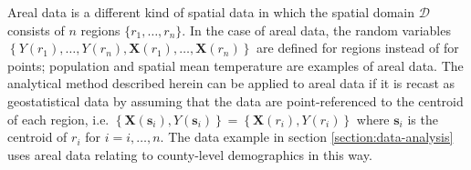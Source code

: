 \documentclass[authoryear, review, 11pt]{elsarticle}
\begin{document}
	Areal data is a different kind of spatial data in which the spatial domain $\mathcal{D}$ consists of $n$ regions $\{r_1, \dots, r_n\}$. In the case of areal data, the random variables $\left\{Y(r_1), \dots, Y(r_n), \bm{X}(r_1), \dots, \bm{X}(r_n)\right\}$ are defined for regions instead of for points; population and spatial mean temperature are examples of areal data. The analytical method described herein can be applied to areal data if it is recast as geostatistical data by assuming that the data are point-referenced to the centroid of each region, i.e. $\left\{\bm{X}(\bm{s}_i), Y(\bm{s}_i)\right\} = \left\{\bm{X}(r_i), Y(r_i)\right\}$ where $\bm{s}_i$ is the centroid of $r_i$ for $i=i, \dots, n$. The data example in section \ref{section:data-analysis} uses areal data relating to county-level demographics in this way.
	
\end{document}
